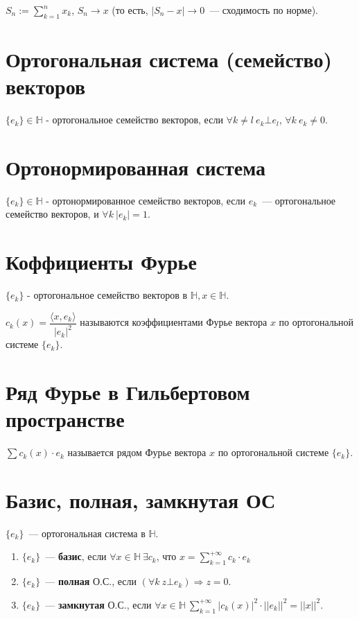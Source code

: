 	$S_n := \sum\limits_{k = 1}^n x_k$, $S_n \rightarrow x$ (то есть, $|S_n - x| \rightarrow 0$~--- сходимость по норме).

    \section{Ортогональная система (семейство) векторов}
	$\{e_k\} \in \mathds{H}$ - ортогональное семейство векторов, если $\forall k \neq l ~ e_k \bot e_l$, $\forall k\ e_k \neq 0$.

	\section{Ортонормированная система}
	$\{e_k\} \in \mathds{H}$ - ортонормированное семейство векторов, если ${e_k}$~--- ортогональное семейство векторов, и $\forall k ~ |e_k| = 1$.

	\section{Коффициенты Фурье}
	$\{e_k\}$ - ортогональное семейство векторов в $\mathds{H}, x \in \mathds{H}$.

	$c_k(x) = \dfrac{\langle x, e_k \rangle}{|e_k|^2}$ называются коэффициентами Фурье вектора $x$ по ортогональной системе $\{e_k\}$.

	\section{Ряд Фурье в Гильбертовом пространстве}

	$\sum c_k(x) \cdot e_k$ называется рядом Фурье вектора $x$ по ортогональной системе $\{e_k\}$.

	\section{Базис, полная, замкнутая ОС}

	$\{e_k\}$~--- ортогональная система в $\mathds{H}$.

	\begin{enumerate}

		\item $\{e_k\}$~--- \textbf{базис}, если $\forall x \in \mathds{H}\ \exists c_k$, что $x = \sum\limits_{k=1}^{+\infty} c_k \cdot e_k$

		\item $\{e_k\}$~--- \textbf{полная} О.С., если $(\forall k ~ z \bot e_k) \Rightarrow z = 0$.

		\item $\{e_k\}$~--- \textbf{замкнутая} О.С., если $\forall x \in \mathds{H} ~ \sum\limits_{k=1}^{+\infty} |c_k(x)|^2 \cdot ||e_k||^2 = ||x||^2$.

	\end{enumerate}

